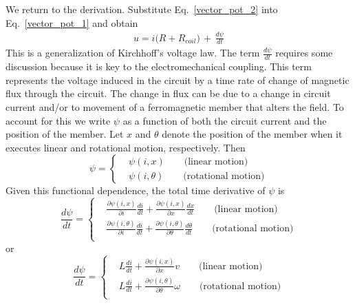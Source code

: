 \documentclass[12pt,a4paper,oneside]{book}
\begin{document}
\begin{onehalfspace}
We return to the derivation. Substitute Eq.~\eqref{vector_pot_2} into Eq.~\eqref{vector_pot_1} and obtain
 \begin{equation}\label{vector_pot_3}
	\begin{aligned}
		u = i\big(R+R_{coil}\big)\, + \, \frac{d \psi}{d t}
	\end{aligned}
\end{equation} 
This is a generalization of Kirchhoff's voltage law. The term $\frac{d \psi}{d t}$ requires some discussion because it is key to the electromechanical coupling. This term represents the voltage induced in the circuit by a time rate of change of magnetic flux through the circuit. The change in flux can be due to a change in circuit current and/or to movement of a ferromagnetic member that alters the field. To account for this we write $\psi$ as a function of both the circuit current and the position of the member. Let $x$ and $\theta$ denote the position of the member when it executes linear and rotational motion, respectively. Then
 \begin{equation*}\label{}
	\psi = \left\lbrace 
	\begin{aligned}
		&\psi(i,x)\qquad\text{(linear motion)} \\[8pt]
		&\psi(i,\theta)\qquad\text{(rotational motion)} 
	\end{aligned}\right. 
\end{equation*}
Given this functional dependence, the total time derivative of $\psi$ is
 \begin{equation*}\label{}
	\frac{d\psi }{dt} = \left\lbrace 
	\begin{aligned}
		&\frac{\partial \psi(i,x)}{\partial i}\frac{d i}{d t} + \frac{\partial \psi(i,x)}{\partial x}\frac{d x}{d t} \qquad\text{(linear motion)} \\[8pt]
		&\frac{\partial \psi(i,\theta)}{\partial i}\frac{d i}{d t} + \frac{\partial \psi(i,\theta)}{\partial \theta}\frac{d \theta}{d t} \qquad\text{(rotational motion)} \\[8pt]
	\end{aligned}\right. 
\end{equation*}
or 
 \begin{equation}\label{}
	\frac{d\psi }{dt} = \left\lbrace 
	\begin{aligned}
		&L\frac{d i}{d t} + \frac{\partial \psi(i,x)}{\partial x}v \qquad\text{(linear motion)} \\[8pt]
		&L\frac{d i}{d t} + \frac{\partial \psi(i,\theta)}{\partial \theta}\omega \qquad\text{(rotational motion)} \\[8pt]

\end{aligned}
\end{equation}
\end{onehalfspace}
\end{document}
